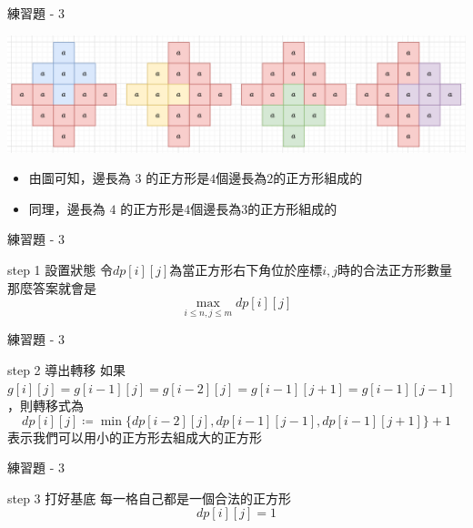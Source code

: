 \documentclass[aspectratio=169]{beamer}
\begin{document}
    \begin{frame}{練習題 - 3}
        \begin{center}
            \includegraphics[scale=0.5]{images/CF1393D_square.png}
        \end{center}
        \begin{itemize}
            \item<2-> 由圖可知，邊長為 $3$ 的正方形是$4$個邊長為$2$的正方形組成的
            \item<3-> 同理，邊長為 $4$ 的正方形是$4$個邊長為$3$的正方形組成的
        \end{itemize}
    \end{frame}

    \begin{frame}{練習題 - 3}
        \begin{alertblock}{step 1 設置狀態}
            令$dp[i][j]$為當正方形右下角位於座標${i,j}$時的合法正方形數量\\
            \vspace{2mm}
            那麼答案就會是 $$\max_{i \le n,j \le m}dp[i][j]$$
        \end{alertblock}
    \end{frame}

    \begin{frame}{練習題 - 3}
        \begin{block}{step 2 導出轉移}
            如果 $g[i][j]=g[i-1][j]=g[i-2][j]=g[i-1][j+1]=g[i-1][j-1]$，則轉移式為
            $$dp[i][j] \coloneqq \min\{dp[i-2][j],dp[i-1][j-1],dp[i-1][j+1]\} + 1$$
            表示我們可以用小的正方形去組成大的正方形
        \end{block}
    \end{frame}
    
    \begin{frame}{練習題 - 3}
        \begin{block}{step 3 打好基底}
            每一格自己都是一個合法的正方形\\
            $$dp[i][j]=1$$
        \end{block}
    \end{frame}
\end{document}
